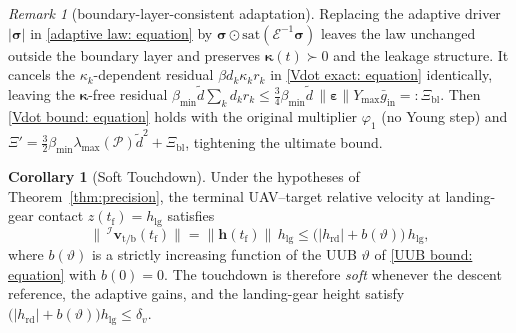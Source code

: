 \documentclass{IEEEtaes}
\theoremstyle{definition}
\newtheorem{corollary}{Corollary}
\theoremstyle{remark}
\newtheorem{remark}{Remark}
\begin{document}
\begin{remark}[boundary-layer-consistent adaptation]\label{rem:satdriver}
Replacing the adaptive driver $|\boldsymbol{\sigma}|$ in \eqref{adaptive law: equation} by $\boldsymbol{\sigma}\odot\text{sat}(\mathcal{E}^{-1}\boldsymbol{\sigma})$ leaves the law unchanged outside the boundary layer and preserves $\boldsymbol{\kappa}(t)\succ0$ and the leakage structure. It cancels the $\kappa_k$-dependent residual $\beta d_k\kappa_k r_k$ in \eqref{Vdot exact: equation} identically, leaving the $\boldsymbol{\kappa}$-free residual $\beta_{\min}\tilde{d}\sum_k d_k r_k\le\tfrac34\beta_{\min}\tilde{d}\,\|\boldsymbol{\varepsilon}\|Y_{\max}\bar{g}_\text{in}=:\Xi_\text{bl}$. Then \eqref{Vdot bound: equation} holds with the original multiplier $\varphi_1$ (no Young step) and $\Xi'=\tfrac32\beta_{\min}\lambda_{\max}(\mathcal{P})\tilde{d}^2+\Xi_\text{bl}$, tightening the ultimate bound.
\end{remark}

\begin{corollary}[Soft Touchdown]\label{cor:soft} Under the hypotheses of Theorem~\ref{thm:precision}, the terminal UAV--target relative velocity at landing-gear contact $z(t_\text{f})=h_\text{lg}$ satisfies
\begin{equation} \label{soft touchdown bound: equation}
    \|\,^\mathcal{I}\boldsymbol{v}_{\text{t/b}}(t_\text{f})\| = \|\boldsymbol{h}(t_\text{f})\|\,h_\text{lg} \le \big(|h_\text{rd}| + b(\vartheta)\big)\,h_\text{lg},
\end{equation}
where $b(\vartheta)$ is a strictly increasing function of the UUB $\vartheta$ of \eqref{UUB bound: equation} with $b(0)=0$. The touchdown is therefore \emph{soft} whenever the descent reference, the adaptive gains, and the landing-gear height satisfy $\big(|h_\text{rd}|+b(\vartheta)\big)h_\text{lg}\le\delta_v$.
\end{corollary}
\end{document}
